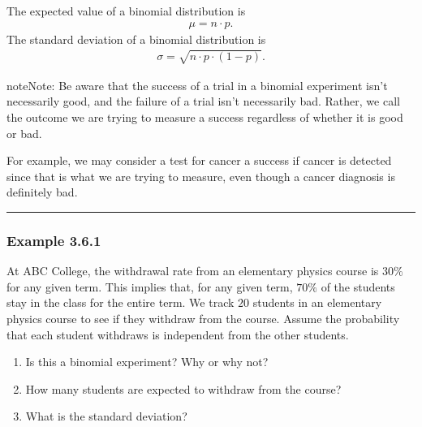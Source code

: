 \documentclass[letterpaper,10pt,english]{jupyterBook}
\begin{document}
\sphinxAtStartPar
The expected value of a binomial distribution is
\begin{equation*}
\begin{split} \mu = n \cdot p. \end{split}
\end{equation*}
\sphinxAtStartPar
The standard deviation of a binomial distribution is
\begin{equation*}
\begin{split} \sigma = \sqrt{n \cdot p \cdot (1-p)}. \end{split}
\end{equation*}
\begin{sphinxadmonition}{note}{Note:}
\sphinxAtStartPar
Be aware that the success of a trial in a binomial experiment isn’t necessarily good, and the failure of a trial isn’t necessarily bad. Rather, we call the outcome we are trying to measure a success regardless of whether it is good or bad.

\sphinxAtStartPar
For example, we may consider a test for cancer a success if cancer is detected since that is what we are trying to measure, even though a cancer diagnosis is definitely bad.
\end{sphinxadmonition}


\bigskip\hrule\bigskip



\subsubsection{Example 3.6.1}
\label{\detokenize{Ch3 Probability/3.6 The Binomial Distribution:example-3-6-1}}
\sphinxAtStartPar
At ABC College, the withdrawal rate from an elementary physics course is \(30\%\) for any given term. This implies that, for any given term, \(70\%\) of the students stay in the class for the entire term. We track \(20\) students in an elementary physics course to see if they withdraw from the course. Assume the probability that each student withdraws is independent from the other students.
\begin{enumerate}
%
\item {} 
\sphinxAtStartPar
Is this a binomial experiment? Why or why not?

\item {} 
\sphinxAtStartPar
How many students are expected to withdraw from the course?

\item {} 
\sphinxAtStartPar
What is the standard deviation?

\end{enumerate}
\end{document}
